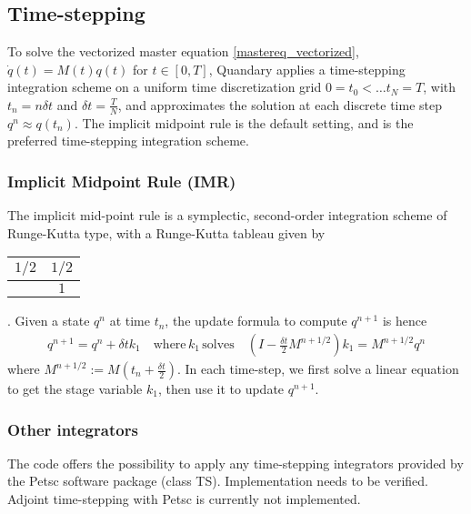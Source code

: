 \documentclass[11pt]{article}
\begin{document}
    \subsection{Time-stepping}
    To solve the vectorized master equation \eqref{mastereq_vectorized}, $\dot
    q(t) = M(t) q(t)$ for $t\in [0,T]$, Quandary applies a time-stepping integration
    scheme on a uniform time discretization grid $0=t_0 < \dots t_{N} = T$, with
    $t_n = n \delta t$ and $\delta t = \frac{T}{N}$, and approximates the
    solution at each discrete time step $q^{n} \approx q(t_n)$. The implicit midpoint rule is the default setting, and is the preferred time-stepping integration scheme. 
   
    \subsubsection{Implicit Midpoint Rule (IMR)} 
    The implicit mid-point rule is a symplectic, second-order integration scheme
    of Runge-Kutta type, with a Runge-Kutta tableau given by
    \begin{tabular}{ c | c }
      $1/2$ & $ 1/2$ \\
      \hline
                &  $1$
    \end{tabular}.
    Given a state $q^n$ at time $t_n$, the update formula to compute $q^{n+1}$
    is hence 
    \begin{align}
      q^{n+1} = q^n + \delta t k_1 \quad \text{where} \, k_1 \, \text{solves}
      \quad \left( I-\frac{\delta t}{2} M^{n+1/2} \right) k_1 = M^{n+1/2}  q^n
    \end{align}
    where $M^{n+1/2} := M(t_n + \frac{\delta t}{2})$. In each time-step, we
    first solve a linear equation to get the stage variable $k_1$, then use it
    to update $q^{n+1}$. 

    \subsubsection{Other integrators}
    The code offers the possibility to apply any time-stepping integrators
    provided by the Petsc software package (class TS). Implementation needs to
    be verified. Adjoint time-stepping with Petsc is currently not
    implemented. 
\end{document}
